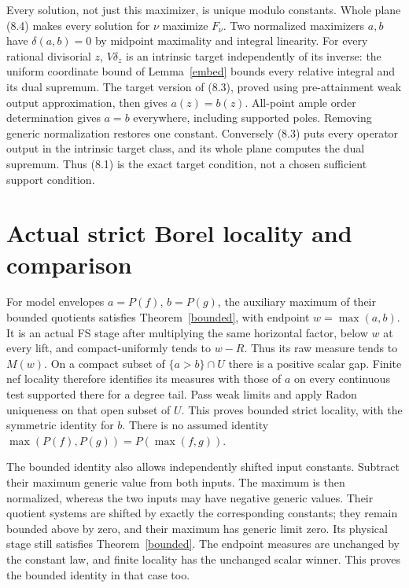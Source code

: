 \documentclass[10pt]{article}
\begin{document}
Every solution, not just this maximizer, is unique modulo constants.
Whole plane (8.4) makes every solution for $\nu$ maximize $F_\nu$.
Two normalized maximizers $a,b$ have $\delta(a,b)=0$ by midpoint
maximality and integral linearity. For every rational divisorial $z$,
$V\delta_z$ is an intrinsic target independently of its inverse:
the uniform coordinate bound of Lemma~\ref{embed} bounds every relative
integral and its dual supremum. The target version of (8.3), proved
using pre-attainment weak output approximation, then gives $a(z)=b(z)$.
All-point ample order determination gives $a=b$ everywhere, including
supported poles. Removing generic normalization restores one constant.
Conversely (8.3) puts every operator output in the intrinsic target class,
and its whole plane computes the dual supremum. Thus (8.1) is the exact
target condition, not a chosen sufficient support condition.

\section{Actual strict Borel locality and comparison}
For model envelopes $a=P(f)$, $b=P(g)$, the auxiliary maximum of their
bounded quotients satisfies Theorem~\ref{bounded}, with endpoint
$w=\max(a,b)$. It is an actual FS stage after multiplying the same
horizontal factor, below $w$ at every lift, and compact-uniformly tends
to $w-R$. Thus its raw measure tends to $M(w)$.
On a compact subset of $\{a>b\}\cap U$ there is a positive scalar gap.
Finite nef locality therefore identifies its measures with those of $a$
on every continuous test supported there for a degree tail. Pass weak
limits and apply Radon uniqueness on that open subset of $U$.
This proves bounded strict locality, with the symmetric identity for $b$.
There is no assumed identity $\max(P(f),P(g))=P(\max(f,g))$.

The bounded identity also allows independently shifted input constants.
Subtract their maximum generic value from both inputs. The maximum is
then normalized, whereas the two inputs may have negative generic values.
Their quotient systems are shifted by exactly the corresponding constants;
they remain bounded above by zero, and their maximum has generic limit zero.
Its physical stage still satisfies Theorem~\ref{bounded}. The endpoint
measures are unchanged by the constant law, and finite locality has the
unchanged scalar winner. This proves the bounded identity in that case too.
\end{document}
